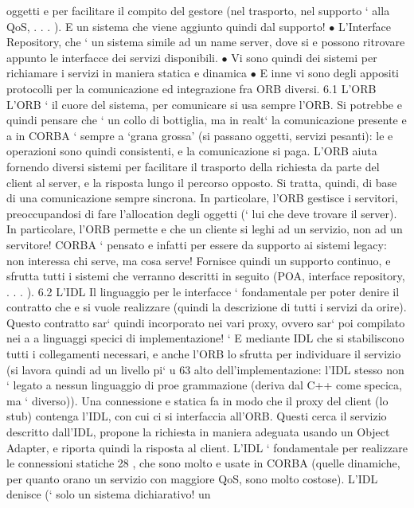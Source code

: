 \documentclass[a4paper,12pt]{article}
\begin{document}
oggetti e per facilitare il compito del gestore (nel trasporto, nel supporto
`
alla QoS, . . . ). E un sistema che viene aggiunto quindi dal supporto!
$\bullet$ L'Interface Repository, che ` un sistema simile ad un name server, dove si
e
possono ritrovare appunto le interfacce dei servizi disponibili.
$\bullet$ Vi sono quindi dei sistemi per richiamare i servizi in maniera statica e
dinamica
$\bullet$ E inne vi sono degli appositi protocolli per la comunicazione ed integrazione fra ORB diversi.
6.1
L'ORB
L'ORB ` il cuore del sistema, per comunicare si usa sempre l'ORB. Si potrebbe
e
quindi pensare che ` un collo di bottiglia, ma in realt` la comunicazione presente
e
a
in CORBA ` sempre a {`}grana grossa' (si passano oggetti, servizi pesanti): le
e
operazioni sono quindi consistenti, e la comunicazione si paga. L'ORB aiuta
fornendo diversi sistemi per facilitare il trasporto della richiesta da parte del
client al server, e la risposta lungo il percorso opposto. Si tratta, quindi, di base
di una comunicazione sempre sincrona.
In particolare, l'ORB gestisce i servitori, preoccupandosi di fare l'allocation
degli oggetti (` lui che deve trovare il server). In particolare, l'ORB permette
e
che un cliente si leghi ad un servizio, non ad un servitore! CORBA ` pensato
e
infatti per essere da supporto ai sistemi legacy: non interessa chi serve, ma
cosa serve! Fornisce quindi un supporto continuo, e sfrutta tutti i sistemi che
verranno descritti in seguito (POA, interface repository, . . . ).
6.2
L'IDL
Il linguaggio per le interfacce ` fondamentale per poter denire il contratto che
e
si vuole realizzare (quindi la descrizione di tutti i servizi da orire). Questo
contratto sar` quindi incorporato nei vari proxy, ovvero sar` poi compilato nei
a
a
linguaggi specici di implementazione!
`
E mediante IDL che si stabiliscono tutti i collegamenti necessari, e anche
l'ORB lo sfrutta per individuare il servizio (si lavora quindi ad un livello pi`
u
63
alto dell'implementazione: l'IDL stesso non ` legato a nessun linguaggio di proe
grammazione (deriva dal C++ come specica, ma ` diverso)). Una connessione
e
statica fa in modo che il proxy del client (lo stub) contenga l'IDL, con cui ci
si interfaccia all'ORB. Questi cerca il servizio descritto dall'IDL, propone la
richiesta in maniera adeguata usando un Object Adapter, e riporta quindi la
risposta al client.
L'IDL ` fondamentale per realizzare le connessioni statiche 28 , che sono molto
e
usate in CORBA (quelle dinamiche, per quanto orano un servizio con maggiore
QoS, sono molto costose). L'IDL denisce (` solo un sistema dichiarativo! un
\end{document}

